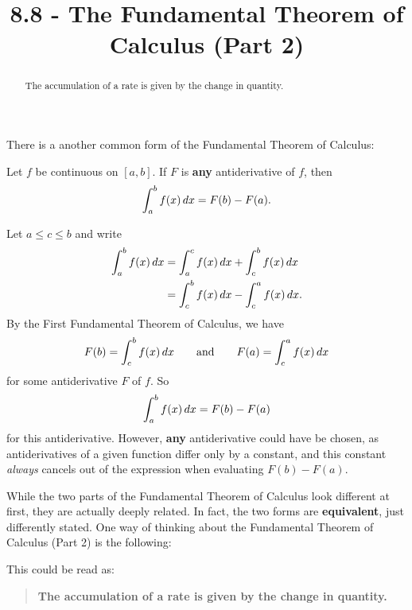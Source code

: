 \documentclass{ximera}
\title{8.8 - The Fundamental Theorem of Calculus (Part 2)}
\begin{document}
\begin{abstract}
The accumulation of a rate is given by the change in quantity.
\end{abstract}
\maketitle

There is a another common form of the Fundamental Theorem of Calculus:

\begin{theorem}
  Let $f$ be continuous on $[a,b]$. If $F$ is \textbf{any}
  antiderivative of $f$, then
  \[
  \int_a^b f(x)\mathop{}\!d x = F(b)-F(a).
  \]
  \begin{explanation}
    Let $a\le c\le b$ and write
    \begin{align*}
      \int_a^b f(x) \mathop{}\!d x &= \int_a^c f(x) \mathop{}\!d x + \int_c^b f(x) \mathop{}\!d x \\
      &= \int_c^b f(x) \mathop{}\!d x - \int_c^a f(x) \mathop{}\!d x.
    \end{align*}
    By the First Fundamental Theorem of Calculus, we have
    \[
    F(b) = \int_c^b f(x) \mathop{}\!d x\qquad\text{and}\qquad F(a) = \int_c^a f(x) \mathop{}\!d x
    \] 
    for some antiderivative $F$ of $f$. So
    \[
    \int_a^b f(x) \mathop{}\!d x = F(b)-F(a)
    \]
    for this antiderivative. However, \textbf{any} antiderivative
    could have be chosen, as antiderivatives of a given function
    differ only by a constant, and this constant \textit{always}
    cancels out of the expression when evaluating $F(b)-F(a)$.
\end{explanation}
\end{theorem}

While the two parts of the Fundamental Theorem of Calculus look different at first, they are actually deeply related. In fact, the two forms are
\textbf{equivalent}, just differently stated. %
One way of thinking about the Fundamental Theorem of Calculus (Part 2) is the following:
\begin{image}
\end{image}
This could be read as:
\begin{quote}\large\textbf{The \textcolor{green!70!black!70!blue}{accumulation} of a \textcolor{blue!70!green}{rate} is given by the \textcolor{purple!50!blue!90!black}{change in quantity}.}
\end{quote}
\end{document}
